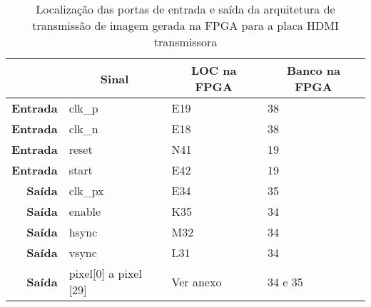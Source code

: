 \begin{table}[h!]
	\centering
		\begin{tabular}{rlll}
			\hline
			\multicolumn{1}{c}{\textbf{}}         & \multicolumn{1}{c}{\textbf{Sinal}} & \multicolumn{1}{c}{\textbf{LOC na FPGA}} & \multicolumn{1}{c}{\textbf{Banco na FPGA}} \\ \hline
			\multicolumn{1}{r|}{\textbf{Entrada}} & clk\_p                             & E19                                      & 38                                         \\
			\multicolumn{1}{r|}{\textbf{Entrada}} & clk\_n                             & E18                                      & 38                                         \\
			\multicolumn{1}{r|}{\textbf{Entrada}} & reset                              & N41                                      & 19                                         \\
			\multicolumn{1}{r|}{\textbf{Entrada}} & start                              & E42                                      & 19                                         \\
			\multicolumn{1}{r|}{\textbf{Saída}}   & clk\_px                            & E34                                      & 35                                         \\
			\multicolumn{1}{r|}{\textbf{Saída}}   & enable                             & K35                                      & 34                                         \\
			\multicolumn{1}{r|}{\textbf{Saída}}   & hsync                              & M32                                      & 34                                         \\
			\multicolumn{1}{r|}{\textbf{Saída}}   & vsync                              & L31                                      & 34                                         \\
			\multicolumn{1}{r|}{\textbf{Saída}}   & pixel[0] a pixel [29]                              & Ver anexo                                & 34 e 35                                    \\ \hline
		\end{tabular}
	\caption{Localização das portas de entrada e saída da arquitetura de transmissão de imagem gerada na FPGA para a placa HDMI transmissora}
	\label{table:LOCplanA_simples}
\end{table}


